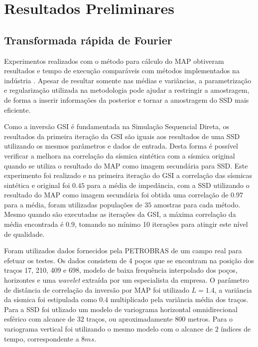\section{Resultados Preliminares}

\subsection{Transformada rápida de Fourier}

Experimentos realizados com o método para cálculo do MAP obtiveram resultados e
tempo de execução comparáveis com métodos implementados na indústria
\citep{leandroGRSL}. Apesar de resultar somente nas médias e variâncias, a
parametrização e regularização utilizada na metodologia pode ajudar a restringir
a amostragem, de forma a inserir informações da posterior e tornar a amostragem
do SSD mais eficiente.


Como a inversão GSI é fundamentada na Simulação Sequencial Direta, os resultados
da primeira iteração da GSI são iguais aos resultados de uma SSD utilizando os
mesmos parâmetros e dados de entrada. Desta forma é possível verificar a melhora
na correlação da sísmica sintética com a sísmica original quando se utiliza o
resultado do MAP como imagem secundária para SSD. Este experimento foi realizado
e na primeira iteração do GSI a correlação das sísmicas sintética e original foi
$0.45$ para a média de impedância, com a SSD utilizando o resultado do MAP como
imagem secundária foi obtida uma correlação de $0.97$ para a média, foram
utilizadas populações de $35$ amostras para cada método. Mesmo quando são
executadas as iterações da GSI, a máxima correlação da média encontrada é $0.9$,
tomando no mínimo 10 iterações para atingir este nível de qualidade.

Foram utilizados dados fornecidos pela PETROBRAS de um campo real para efetuar
os testes. Os dados consistem de 4 poços que se encontram na posição dos traços
17, 210, 409 e 698, modelo de baixa frequência interpolado dos poços, horizontes
e uma \textit{wavelet} extraída por um especialista da empresa. O parâmetro de
distância de correlação da inversão por MAP foi utilizado $L=1.4$, a variância da sísmica
foi estipulada como $0.4$ multiplicado pela variância média dos traços.
Para a SSD foi utlizado um modelo de variograma horizontal omnidirecional
esférico com alcance de $32$ traços, ou aproximadamente $800$ metros. Para o
variograma vertical foi utilizando o mesmo modelo com o alcance de $2$ índices
de tempo, correspondente a $8ms$.

